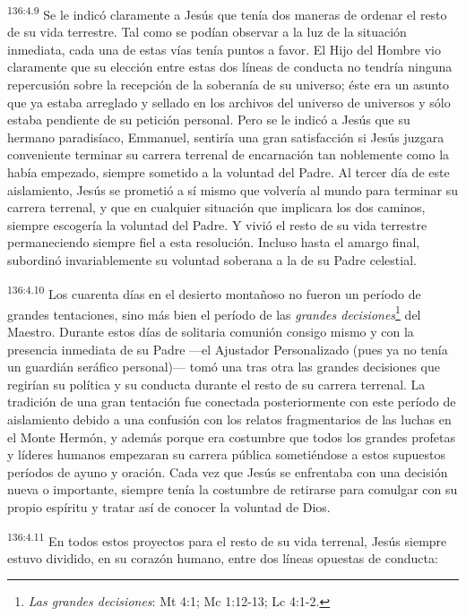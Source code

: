 \par
\textsuperscript{136:4.9} Se le indicó claramente a Jesús que tenía dos maneras de ordenar el resto de su vida terrestre. Tal como se podían observar a la luz de la situación inmediata, cada una de estas vías tenía puntos a favor. El Hijo del Hombre vio claramente que su elección entre estas dos líneas de conducta no tendría ninguna repercusión sobre la recepción de la soberanía de su universo; éste era un asunto que ya estaba arreglado y sellado en los archivos del universo de universos y sólo estaba pendiente de su petición personal. Pero se le indicó a Jesús que su hermano paradisíaco, Emmanuel, sentiría una gran satisfacción si Jesús juzgara conveniente terminar su carrera terrenal de encarnación tan noblemente como la había empezado, siempre sometido a la voluntad del Padre. Al tercer día de este aislamiento, Jesús se prometió a sí mismo que volvería al mundo para terminar su carrera terrenal, y que en cualquier situación que implicara los dos caminos, siempre escogería la voluntad del Padre. Y vivió el resto de su vida terrestre permaneciendo siempre fiel a esta resolución. Incluso hasta el amargo final, subordinó invariablemente su voluntad soberana a la de su Padre celestial.

\par
\textsuperscript{136:4.10} Los cuarenta días en el desierto montañoso no fueron un período de grandes tentaciones, sino más bien el período de las \textit{grandes decisiones}\footnote{\textit{Las grandes decisiones}: Mt 4:1; Mc 1:12-13; Lc 4:1-2.} del Maestro. Durante estos días de solitaria comunión consigo mismo y con la presencia inmediata de su Padre ---el Ajustador Personalizado (pues ya no tenía un guardián seráfico personal)--- tomó una tras otra las grandes decisiones que regirían su política y su conducta durante el resto de su carrera terrenal. La tradición de una gran tentación fue conectada posteriormente con este período de aislamiento debido a una confusión con los relatos fragmentarios de las luchas en el Monte Hermón, y además porque era costumbre que todos los grandes profetas y líderes humanos empezaran su carrera pública sometiéndose a estos supuestos períodos de ayuno y oración. Cada vez que Jesús se enfrentaba con una decisión nueva o importante, siempre tenía la costumbre de retirarse para comulgar con su propio espíritu y tratar así de conocer la voluntad de Dios.

\par
\textsuperscript{136:4.11} En todos estos proyectos para el resto de su vida terrenal, Jesús siempre estuvo dividido, en su corazón humano, entre dos líneas opuestas de conducta:

